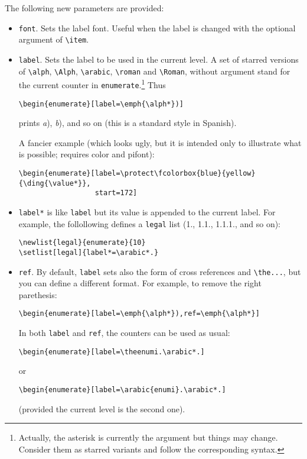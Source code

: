 \documentclass{article}
\begin{document}
The following new parameters are provided:
\begin{itemize}

\item \verb|font|. Sets the label font. Useful when the label is
changed with the optional argument of \verb|\item|.

\item \verb|label|.  Sets the label to be used in the current level.
A set of starred versions of \verb|\alph|, \verb|\Alph|,
\verb|\arabic|, \verb|\roman| and \verb|\Roman|, without argument
stand for the current counter in \verb|enumerate|.\footnote{Actually,
the asterisk is currently the argument but things may change.
Consider them as starred variants and follow the corresponding
syntax.} Thus
\begin{verbatim}
\begin{enumerate}[label=\emph{\alph*})]
\end{verbatim}
prints \textit{a}), \textit{b}), and so on (this is a
standard style in Spanish).

A fancier example (which looks ugly, but it is intended only
to illustrate what is possible; requires \textsf{color} and
\textsf{pifont}):
\begin{verbatim}
\begin{enumerate}[label=\protect\fcolorbox{blue}{yellow}{\ding{\value*}},
                  start=172]
\end{verbatim}

\item \verb|label*| is like \verb|label| but its value is appended to 
the current label. For example, the follollowing defines a 
\verb|legal| list (1., 1.1., 1.1.1., and so on):
\begin{verbatim}
\newlist{legal}{enumerate}{10}
\setlist[legal]{label*=\arabic*.}
\end{verbatim}


\item \verb|ref|. By default, \verb|label| sets also the form of cross
references and \verb|\the...|, but you can define a
different format. For
example, to remove the right parethesis:
\begin{verbatim}
\begin{enumerate}[label=\emph{\alph*}),ref=\emph{\alph*}]
\end{verbatim}
In both \verb|label| and \verb|ref|, the counters can be
used as usual:
\begin{verbatim}
\begin{enumerate}[label=\theenumi.\arabic*.]
\end{verbatim}
or
\begin{verbatim}
\begin{enumerate}[label=\arabic{enumi}.\arabic*.]
\end{verbatim}
(provided the current level is the second one).


\end{itemize}
\end{document}
